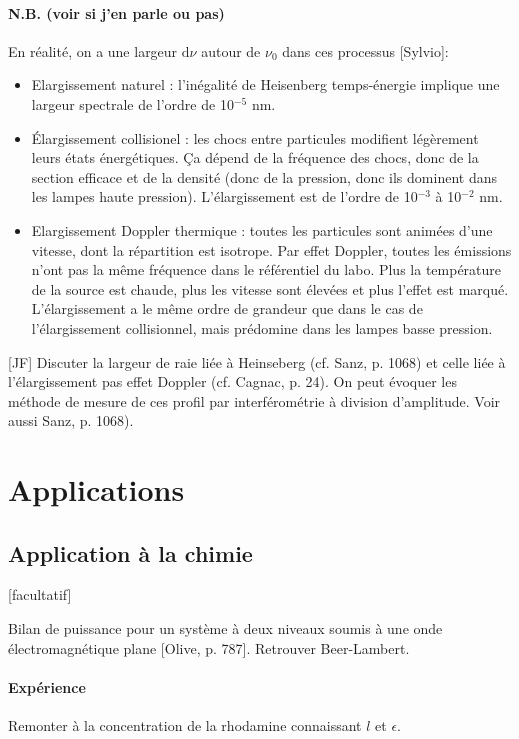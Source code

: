 \documentclass[11pt]{report}
\numberwithin{figure}{section}
\numberwithin{equation}{section}
\numberwithin{table}{section}
\newcommand{\ud}{\mathrm{d}}
\newcommand{\1}{\boldsymbol{1}}
\begin{document}
\paragraph{N.B. (voir si j'en parle ou pas)} En réalité, on a une largeur $\ud \nu$ autour de $\nu_0$ dans ces processus [Sylvio]:
\begin{itemize}
\item Elargissement naturel : l'inégalité de Heisenberg temps-énergie implique une largeur spectrale de l’ordre de
10$^{-5}$ nm.
\item Élargissement collisionel : les chocs entre particules modifient légèrement leurs états énergétiques. Ça dépend de la fréquence des chocs, donc de la section efficace et de la densité (donc de la pression, donc ils dominent dans les lampes haute pression). L’élargissement est de l’ordre de 10$^{-3}$ à 10$^{-2}$ nm.
\item Elargissement Doppler thermique : toutes les particules sont animées d’une vitesse, dont la répartition est isotrope. Par effet Doppler, toutes les émissions n’ont pas la même fréquence dans le référentiel du labo. Plus la température de la source est chaude, plus les vitesse sont élevées et plus l’effet est marqué. L’élargissement a le même ordre de grandeur que dans le cas de l’élargissement collisionnel, mais prédomine dans les lampes basse pression.
\end{itemize}

[JF] Discuter la largeur de raie liée à Heinseberg (cf. Sanz, p. 1068) et celle liée à l’élargissement pas effet Doppler (cf. Cagnac, p. 24). On peut évoquer les méthode de mesure de ces profil par interférométrie à division d’amplitude. Voir aussi Sanz, p. 1068).

\section{Applications}

\subsection{Application à la chimie}

[facultatif]

Bilan de puissance pour un système à deux niveaux soumis à une onde électromagnétique plane [Olive, p. 787]. Retrouver Beer-Lambert.

\paragraph{Expérience} Remonter à la concentration de la rhodamine connaissant $l$ et $\epsilon$.
\end{document}
